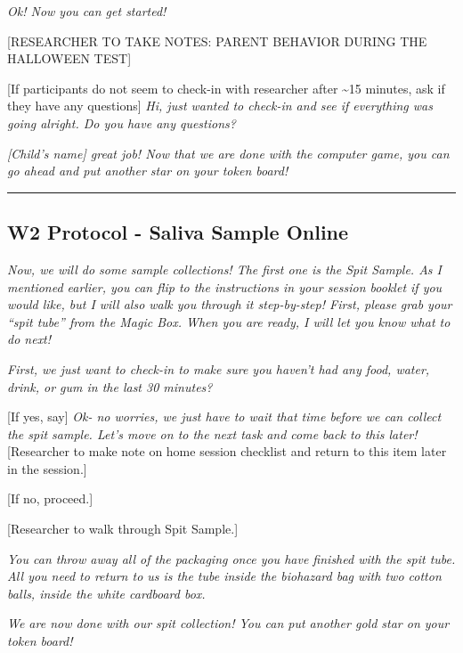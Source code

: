 \documentclass[
]{book}
\begin{document}
\emph{Ok! Now you can get started!}

{[}RESEARCHER TO TAKE NOTES: PARENT BEHAVIOR DURING THE HALLOWEEN TEST{]}

{[}If participants do not seem to check-in with researcher after \textasciitilde15 minutes, ask if they have any questions{]} \emph{Hi, just wanted to check-in and see if everything was going alright. Do you have any questions?}

\emph{{[}Child's name{]} great job! Now that we are done with the computer game, you can go ahead and put another star on your token board!}

\begin{center}\rule{0.5\linewidth}{0.5pt}\end{center}

\hypertarget{w2-protocol---saliva-sample-online}{%
\subsection{W2 Protocol - Saliva Sample Online}\label{w2-protocol---saliva-sample-online}}

\emph{Now, we will do some sample collections! The first one is the Spit Sample. As I mentioned earlier, you can flip to the instructions in your session booklet if you would like, but I will also walk you through it step-by-step! First, please grab your ``spit tube'' from the Magic Box. When you are ready, I will let you know what to do next!}

\emph{First, we just want to check-in to make sure you haven't had any food, water, drink, or gum in the last 30 minutes?}

{[}If yes, say{]} \emph{Ok- no worries, we just have to wait that time before we can collect the spit sample. Let's move on to the next task and come back to this later!} {[}Researcher to make note on home session checklist and return to this item later in the session.{]}

{[}If no, proceed.{]}

{[}Researcher to walk through Spit Sample.{]}

\emph{You can throw away all of the packaging once you have finished with the spit tube. All you need to return to us is the tube inside the biohazard bag with two cotton balls, inside the white cardboard box.}

\emph{We are now done with our spit collection! You can put another gold star on your token board!}
\end{document}
